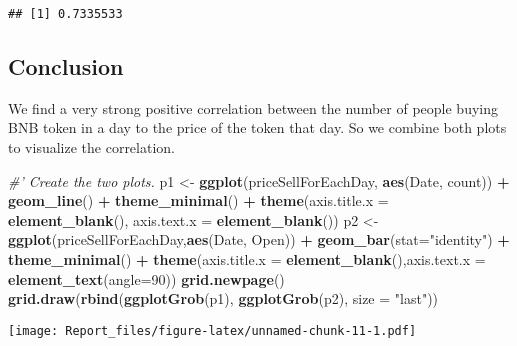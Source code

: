 \documentclass[]{article}
\newenvironment{Shaded}{\begin{snugshade}}{\end{snugshade}}
\newcommand{\KeywordTok}[1]{\textcolor[rgb]{0.13,0.29,0.53}{\textbf{#1}}}
\newcommand{\DataTypeTok}[1]{\textcolor[rgb]{0.13,0.29,0.53}{#1}}
\newcommand{\DecValTok}[1]{\textcolor[rgb]{0.00,0.00,0.81}{#1}}
\newcommand{\StringTok}[1]{\textcolor[rgb]{0.31,0.60,0.02}{#1}}
\newcommand{\CommentTok}[1]{\textcolor[rgb]{0.56,0.35,0.01}{\textit{#1}}}
\newcommand{\OperatorTok}[1]{\textcolor[rgb]{0.81,0.36,0.00}{\textbf{#1}}}
\newcommand{\NormalTok}[1]{#1}
\begin{document}
\begin{verbatim}
## [1] 0.7335533
\end{verbatim}

\subsection{Conclusion}\label{conclusion-1}

We find a very strong positive correlation between the number of people
buying BNB token in a day to the price of the token that day. So we
combine both plots to visualize the correlation.

\begin{Shaded}
\begin{Highlighting}[]
\CommentTok{#' Create the two plots.}
\NormalTok{p1 <-}\StringTok{ }\KeywordTok{ggplot}\NormalTok{(priceSellForEachDay, }\KeywordTok{aes}\NormalTok{(Date, count)) }\OperatorTok{+}\StringTok{ }\KeywordTok{geom_line}\NormalTok{() }\OperatorTok{+}\StringTok{ }\KeywordTok{theme_minimal}\NormalTok{() }\OperatorTok{+}\StringTok{ }
\StringTok{      }\KeywordTok{theme}\NormalTok{(}\DataTypeTok{axis.title.x =} \KeywordTok{element_blank}\NormalTok{(), }\DataTypeTok{axis.text.x =} \KeywordTok{element_blank}\NormalTok{())}
\NormalTok{p2 <-}\StringTok{ }\KeywordTok{ggplot}\NormalTok{(priceSellForEachDay,}\KeywordTok{aes}\NormalTok{(Date, Open)) }\OperatorTok{+}\StringTok{ }\KeywordTok{geom_bar}\NormalTok{(}\DataTypeTok{stat=}\StringTok{"identity"}\NormalTok{) }\OperatorTok{+}\StringTok{ }\KeywordTok{theme_minimal}\NormalTok{() }\OperatorTok{+}\StringTok{ }
\StringTok{      }\KeywordTok{theme}\NormalTok{(}\DataTypeTok{axis.title.x =} \KeywordTok{element_blank}\NormalTok{(),}\DataTypeTok{axis.text.x =} \KeywordTok{element_text}\NormalTok{(}\DataTypeTok{angle=}\DecValTok{90}\NormalTok{))}
\KeywordTok{grid.newpage}\NormalTok{()}
\KeywordTok{grid.draw}\NormalTok{(}\KeywordTok{rbind}\NormalTok{(}\KeywordTok{ggplotGrob}\NormalTok{(p1), }\KeywordTok{ggplotGrob}\NormalTok{(p2), }\DataTypeTok{size =} \StringTok{"last"}\NormalTok{))}
\end{Highlighting}
\end{Shaded}

\texttt{[image: Report\_files/figure-latex/unnamed-chunk-11-1.pdf]}
\end{document}
